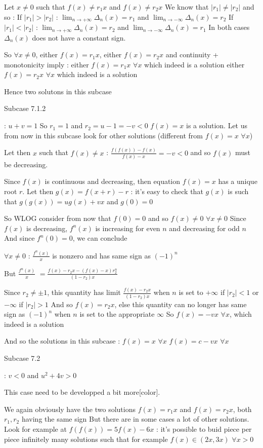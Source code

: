 \begin{solution}
Let $x\ne 0$ such that $f(x)\ne r_1x$ and $f(x)\ne r_2x$
We know that $|r_1|\ne |r_2|$ and so :
If $|r_1|>|r_2|$ : $\lim_{n\to +\infty}\Delta_n(x)=r_1$ and $\lim_{n\to -\infty}\Delta_n(x)=r_2$
If $|r_1|<|r_2|$ : $\lim_{n\to +\infty}\Delta_n(x)=r_2$ and $\lim_{n\to -\infty}\Delta_n(x)=r_1$
In both cases $\Delta_n(x)$ does not have a constant sign.

So $\forall x\ne 0$, either $f(x)=r_1x$, either $f(x)=r_2x$ and continuity + monotonicity imply :
either $f(x)=r_1x$ $\forall x$ which indeed is a solution
either $f(x)=r_2x$ $\forall x$ which indeed is a solution

Hence two solutons in this subcase

\begin{bolded}Subcase 7.1.2\end{bolded} : $u+v=1$
So $r_1=1$ and $r_2=u-1=-v<0$
$f(x)=x$ is a solution.
Let us from now in this subcase look for other solutions (different from $f(x)=x$ $\forall x$)

Let then $x$ such that $f(x)\ne x$ : $\frac{f(f(x))-f(x)}{f(x)-x}=-v<0$ and so $f(x)$ must be decreasing.

Since $f(x)$ is continuous and decreasing, then equation $f(x)=x$ has a unique root $r$.
Let then $g(x)=f(x+r)-r$ : it's easy to check that $g(x)$ is such that $g(g(x))=ug(x)+vx$ and $g(0)=0$

So WLOG consider from now that $f(0)=0$ and so $f(x)\ne 0$ $\forall x\ne 0$
Since $f(x)$ is decreasing, $f^{n}(x)$ is increasing for even $n$ and decreasing for odd $n$
And since $f^{n}(0)=0$, we can conclude

$\forall x\ne 0$ : $\frac{f^{n}(x)}x$ is nonzero and has same sign as $(-1)^n$

But $\frac{f^{n}(x)}x$ $=\frac{f(x)-r_2x-(f(x)-x)r_2^n}{(1-r_2)x}$

Since $r_2\ne \pm 1$, this quantity has limit  $\frac{f(x)-r_2x}{(1-r_2)x}$ when $n$ is set to $+\infty$ if $|r_2|<1$ or $-\infty$ if $|r_2|>1$
And so $f(x)=r_2x$, else this quantity can no longer has same sign as $(-1)^n$ when $n$ is set to the appropriate $\infty$
So $f(x)=-vx$ $\forall x$, which indeed is a solution

And so the solutions in this subcase :
$f(x)=x$ $\forall x$
$f(x)=c-vx$ $\forall x$

\begin{bolded}Subcase 7.2\end{bolded} : $v<0$ and $u^2+4v>0$
\begin{bolded}[color=red]This case need to be developped a bit more[\/color].\end{bolded}
We again obviously have the two solutions $f(x)=r_1x$ and $f(x)=r_2x$, both $r_1,r_2$ having the same sign
But there are in some cases a lot of other solutions.
Look for example at $f(f(x))=5f(x)-6x$ : it's possible to buid piece per piece infinitely many solutions such that for example $f(x)\in(2x,3x)$ $\forall x>0$



\end{solution}
